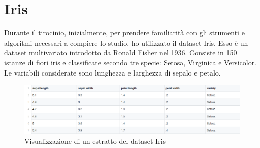 \documentclass[12pt,italian]{report}
\begin{document}
\section{Iris}
Durante il tirocinio, inizialmente, per prendere familiarità con gli strumenti e algoritmi necessari a compiere lo studio, ho utilizzato il dataset Iris. Esso è un dataset multivariato introdotto da Ronald Fisher nel 1936. Consiste in 150 istanze di fiori iris e classificate secondo tre specie: Setosa, Virginica e Versicolor.
Le variabili considerate sono lunghezza e larghezza di sepalo e petalo.
\begin{figure}[h]
	\centering
	\includegraphics[width = 150mm]{immagini/Iris}
	\caption{Visualizzazione di un estratto del dataset Iris}
\end{figure}
\end{document}
